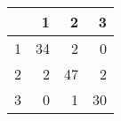 \begin{tabular}{rrrr}
  \hline
 & 1 & 2 & 3 \\ 
  \hline
1 &  34 &   2 &   0 \\ 
  2 &   2 &  47 &   2 \\ 
  3 &   0 &   1 &  30 \\ 
   \hline
\end{tabular}
